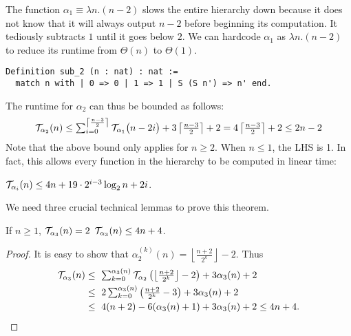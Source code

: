 {\color{red}The function $\alpha_1 \equiv \lambda n.(n-2)$
slows the entire hierarchy down because
it does not know that it will always output $n-2$ before beginning its 
computation.
It tediously subtracts $1$ until it goes below $2$.
We can hardcode $\alpha_1$ as $\lambda n.(n-2)$ to reduce its runtime
from $\Theta(n)$ to $\Theta(1)$.}
\begin{lstlisting}
Definition sub_2 (n : nat) : nat :=
  match n with | 0 => 0 | 1 => 1 | S (S n') => n' end.
\end{lstlisting}
The runtime for $\alpha_2$ can thus be bounded as follows:
\begin{equation*}
\mathcal{T}_{\alpha_2}(n)
 \le \textstyle \sum_{i=0}^{\left\lceil \frac{n-3}{2} \right\rceil} \mathcal{T}_{\alpha_1}\big(n-2i\big) + 3\left\lceil \frac{n-3}{2} \right\rceil + 2  =  4\left\lceil \frac{n-3}{2} \right\rceil + 2
 \le 2n - 2
\end{equation*}
Note that the above bound only applies for $n\ge 2$. When $n\le 1$, the LHS is 1. In fact, this allows every function in the hierarchy to be computed in linear time:
\begin{thm} \label{thm: inv-ack-hier-runtime-improved}
	$\mathcal{T}_{\alpha_i}(n) \le 4n + 19\cdot 2^{i-3}\log_2n + 2i$.
\end{thm}
We need three crucial technical lemmas to prove this theorem.
\begin{lem} \label{lem: inv-ack-3-runtime}
	If $n\ge 1$, $\mathcal{T}_{\alpha_3}(n) = 2$ $\mathcal{T}_{\alpha_3}(n) \le 4n + 4$.
\end{lem}
\begin{proof}
	It is easy to show that $\alpha_2^{(k)}(n) = \left\lfloor \frac{n+2}{2^k} \right\rfloor - 2$. Thus
	\begin{equation*}
	\begin{aligned}
		\runtime_{\alpha_3}(n)
		& \textstyle \le \ \sum_{k=0}^{\alpha_{3}(n)}\runtime_{\alpha_2}\left(\left\lfloor \frac{n+2}{2^k} \right\rfloor - 2\right) + 3\alpha_{3}(n) + 2 \\
		& \textstyle \le \ 2\sum_{k=0}^{\alpha_3(n)}\left(\frac{n+2}{2^k} - 3\right) + 3\alpha_3(n) + 2 \\
		& \le \ 4(n + 2) - 6(\alpha_3(n) + 1) + 3\alpha_3(n) + 2 \le 4n + 4.
	\end{aligned}
\end{equation*}
\end{proof}
